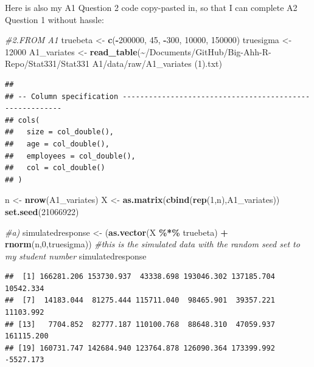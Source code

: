\documentclass[
]{article}
\newenvironment{Shaded}{\begin{snugshade}}{\end{snugshade}}
\newcommand{\CommentTok}[1]{\textcolor[rgb]{0.56,0.35,0.01}{\textit{#1}}}
\newcommand{\DecValTok}[1]{\textcolor[rgb]{0.00,0.00,0.81}{#1}}
\newcommand{\FunctionTok}[1]{\textcolor[rgb]{0.13,0.29,0.53}{\textbf{#1}}}
\newcommand{\NormalTok}[1]{#1}
\newcommand{\OtherTok}[1]{\textcolor[rgb]{0.56,0.35,0.01}{#1}}
\newcommand{\SpecialCharTok}[1]{\textcolor[rgb]{0.81,0.36,0.00}{\textbf{#1}}}
\newcommand{\StringTok}[1]{\textcolor[rgb]{0.31,0.60,0.02}{#1}}
\begin{document}
Here is also my A1 Question 2 code copy-pasted in, so that I can
complete A2 Question 1 without hassle:

\begin{Shaded}
\begin{Highlighting}[]
\CommentTok{\#2.FROM A1 }
\NormalTok{truebeta }\OtherTok{\textless{}{-}} \FunctionTok{c}\NormalTok{(}\SpecialCharTok{{-}}\DecValTok{200000}\NormalTok{, }\DecValTok{45}\NormalTok{, }\SpecialCharTok{{-}}\DecValTok{300}\NormalTok{, }\DecValTok{10000}\NormalTok{, }\DecValTok{150000}\NormalTok{)}
\NormalTok{truesigma }\OtherTok{\textless{}{-}} \DecValTok{12000}
\NormalTok{A1\_variates }\OtherTok{\textless{}{-}} \FunctionTok{read\_table}\NormalTok{(}\StringTok{\textquotesingle{}\textasciitilde{}/Documents/GitHub/Big{-}Ahh{-}R{-}Repo/Stat331/Stat331 A1/data/raw/A1\_variates (1).txt\textquotesingle{}}\NormalTok{)}
\end{Highlighting}
\end{Shaded}

\begin{verbatim}
## 
## -- Column specification --------------------------------------------------------
## cols(
##   size = col_double(),
##   age = col_double(),
##   employees = col_double(),
##   col = col_double()
## )
\end{verbatim}

\begin{Shaded}
\begin{Highlighting}[]
\NormalTok{n }\OtherTok{\textless{}{-}} \FunctionTok{nrow}\NormalTok{(A1\_variates)}
\NormalTok{X }\OtherTok{\textless{}{-}} \FunctionTok{as.matrix}\NormalTok{(}\FunctionTok{cbind}\NormalTok{(}\FunctionTok{rep}\NormalTok{(}\DecValTok{1}\NormalTok{,n),A1\_variates))}
\FunctionTok{set.seed}\NormalTok{(}\DecValTok{21066922}\NormalTok{)}

\CommentTok{\#a)}
\NormalTok{simulatedresponse }\OtherTok{\textless{}{-}}\NormalTok{ (}\FunctionTok{as.vector}\NormalTok{(X }\SpecialCharTok{\%*\%}\NormalTok{ truebeta) }\SpecialCharTok{+} \FunctionTok{rnorm}\NormalTok{(n,}\DecValTok{0}\NormalTok{,truesigma))}
\CommentTok{\#this is the simulated data with the random seed set to my student number}
\NormalTok{simulatedresponse}
\end{Highlighting}
\end{Shaded}

\begin{verbatim}
##  [1] 166281.206 153730.937  43338.698 193046.302 137185.704  10542.334
##  [7]  14183.044  81275.444 115711.040  98465.901  39357.221  11103.992
## [13]   7704.852  82777.187 110100.768  88648.310  47059.937 161115.200
## [19] 160731.747 142684.940 123764.878 126090.364 173399.992  -5527.173
\end{verbatim}
\end{document}
